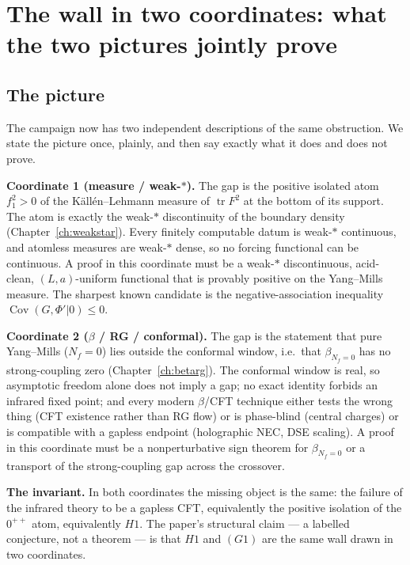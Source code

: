 \section{The wall in two coordinates: what the two pictures jointly prove}
\label{ch:twocoord}

\subsection{The picture}

The campaign now has two independent descriptions of the same obstruction. We state the picture
once, plainly, and then say exactly what it does and does not prove.

\textbf{Coordinate 1 (measure / weak-$*$).} The gap is the positive isolated atom $f_1^2>0$ of
the K\"all\'en--Lehmann measure of $\operatorname{tr}F^2$ at the bottom of its support. The atom
is exactly the weak-$*$ discontinuity of the boundary density (Chapter~\ref{ch:weakstar}). Every
finitely computable datum is weak-$*$ continuous, and atomless measures are weak-$*$ dense, so no
forcing functional can be continuous. A proof in this coordinate must be a weak-$*$
discontinuous, acid-clean, $(L,a)$-uniform functional that is provably positive on the
Yang--Mills measure. The sharpest known candidate is the negative-association inequality
$\operatorname{Cov}(G,\Phi'|0)\le0$.

\textbf{Coordinate 2 ($\beta$ / RG / conformal).} The gap is the statement that pure
Yang--Mills ($N_f=0$) lies outside the conformal window, i.e.\ that $\beta_{N_f=0}$ has no
strong-coupling zero (Chapter~\ref{ch:betarg}). The conformal window is real, so
asymptotic freedom alone does not imply a gap; no exact identity forbids an infrared fixed point;
and every modern $\beta$/CFT technique either tests the wrong thing (CFT existence rather than RG
flow) or is phase-blind (central charges) or is compatible with a gapless endpoint (holographic
NEC, DSE scaling). A proof in this coordinate must be a nonperturbative sign theorem for
$\beta_{N_f=0}$ or a transport of the strong-coupling gap across the crossover.

\textbf{The invariant.} In both coordinates the missing object is the same: the failure of the
infrared theory to be a gapless CFT, equivalently the positive isolation of the $0^{++}$ atom,
equivalently $H1$. The paper's structural claim --- a labelled conjecture, not a theorem --- is
that $H1$ and $(G1)$ are the same wall drawn in two coordinates.

